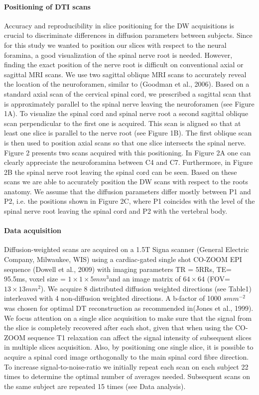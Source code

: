 \paragraph{Positioning of DTI scans} Accuracy and reproducibility in slice positioning for the DW acquisitions is crucial to discriminate differences in diffusion parameters between subjects. Since for this study we wanted to position our slices with respect to the neural foramina, a good visualization of the spinal nerve root is needed. However, finding the exact position of the nerve root is difficult on conventional axial or sagittal MRI scans. We use two sagittal oblique MRI scans to accurately reveal the location of the neuroforamen, similar to (Goodman et al., 2006). Based on a standard axial scan of the cervical spinal cord, we prescribed a sagittal scan that is approximately parallel to the spinal nerve leaving the neuroforamen (see Figure 1A). To visualize the spinal cord and spinal nerve root a second sagittal oblique scan perpendicular to the first one is acquired. This scan is aligned so that at least one slice is parallel to the nerve root (see Figure 1B). The first oblique scan is then used to position axial scans so that one slice intersects the spinal nerve. Figure 2 presents two scans acquired with this positioning. In Figure 2A one can clearly appreciate the neuroforamina between C4 and C7. Furthermore, in Figure 2B the spinal nerve root leaving the spinal cord can be seen. Based on these scans we are able to accurately position the DW scans with respect to the roots anatomy. We assume that the diffusion parameters differ mostly between P1 and P2, i.e. the positions shown in Figure 2C, where P1 coincides with the level of the spinal nerve root leaving the spinal cord and P2 with the vertebral body.

\paragraph{Data acquisition} Diffusion-weighted scans are acquired on a 1.5T Signa scanner (General Electric Company, Milwaukee, WIS) using a cardiac-gated single shot CO-ZOOM EPI sequence (Dowell et al., 2009) with imaging parameters TR = 5RRs, TE= 95.5ms, voxel size = $1\times 1 \times 5mm^3$and an image matrix of $64\times 64$ (FOV=$13\times 13mm^2$). We acquire 8 distributed diffusion weighted directions (see Table1) interleaved with 4 non-diffusion weighted directions. A b-factor of 1000 $smm^{-2}$ was chosen for optimal DT reconstruction as recommended in(Jones et al., 1999). We focus attention on a single slice acquisition to make sure that the signal from the slice is completely recovered after each shot, given that when using the CO-ZOOM sequence T1 relaxation can affect the signal intensity of subsequent slices in multiple slices acquisition. Also, by positioning one single slice, it is possible to acquire a spinal cord image orthogonally to the main spinal cord fibre direction. To increase signal-to-noise-ratio we initially repeat each scan on each subject 22 times to determine the optimal number of averages needed. Subsequent scans on the same subject are repeated 15 times (see Data analysis). 

